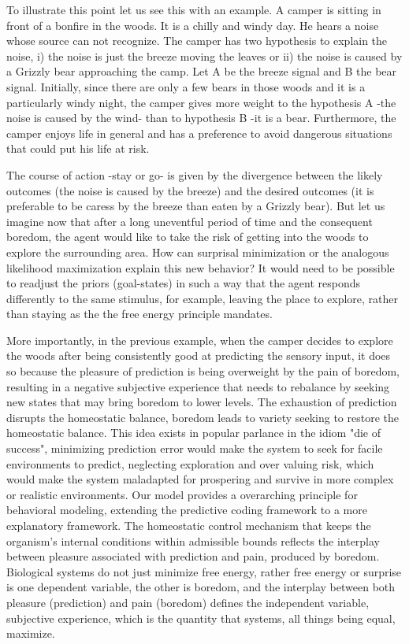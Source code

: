\documentclass[11pt, onecolumn]{article}
\begin{document}
To illustrate this point let us see this with an example. A camper is sitting in front of a bonfire in the woods. It is a chilly and windy day. He hears a noise whose source can not recognize. The camper has two hypothesis to explain the noise, i) the noise is just the breeze moving the leaves or ii) the noise is caused by a Grizzly bear approaching the camp. Let A be the breeze signal and B the bear signal. Initially, since there are only a few bears in those woods and it is a particularly windy night, the camper gives more weight to the hypothesis A -the noise is caused by the wind- than to hypothesis B -it is a bear. Furthermore, the camper enjoys life in general and has a preference to avoid dangerous situations that could put his life at risk.  

The course of action -stay or go- is given by the divergence between the likely outcomes (the noise is caused by the breeze) and the desired outcomes (it is preferable to be caress by the breeze than eaten by a Grizzly bear). But let us imagine now that after a long uneventful period of time and the consequent boredom, the agent would like to take the risk of getting into the woods to explore the surrounding area. 
How can surprisal minimization or the analogous likelihood maximization explain this new behavior? It would need to be possible to readjust the priors (goal-states) in such a way that the agent responds differently to the same stimulus, for example, leaving the place to explore, rather than staying as the the free energy principle mandates. 

More importantly, in the previous example, when the camper decides to explore the woods after being consistently good at predicting the sensory input, it does so because the pleasure of prediction is being overweight by the pain of boredom, resulting in a negative subjective experience that needs to rebalance by seeking new states that may bring boredom to lower levels. The exhaustion of prediction disrupts the homeostatic balance, boredom leads to variety seeking to restore the homeostatic balance. This idea exists in popular parlance in the idiom "die of success", minimizing prediction error would make the system to seek for facile environments to predict, neglecting exploration and over valuing risk, which would make the system maladapted for prospering and survive in more complex or realistic environments. 
Our model provides a overarching principle for behavioral modeling, extending the predictive coding framework to a more explanatory framework. The homeostatic control mechanism that keeps the organism's internal conditions within admissible bounds reflects the interplay between pleasure associated with prediction and pain, 
produced by boredom.
Biological systems do not just minimize free energy, rather free energy or surprise is one dependent variable, the other is boredom, and the interplay between both pleasure (prediction) and pain (boredom) defines the independent variable, subjective experience, which is the quantity that systems, all things being equal, maximize.  
\end{document}
